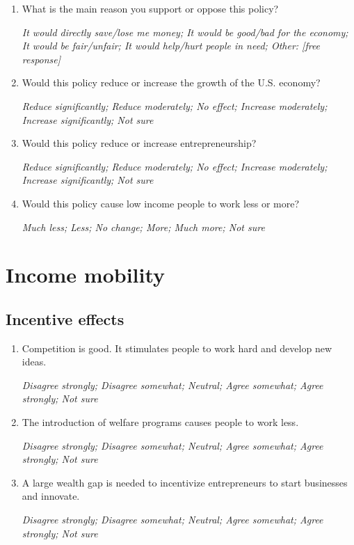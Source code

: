 \documentclass[11pt, headsepline]{article}
\begin{document}
\begin{enumerate}[resume]
    \item What is the main reason you support or oppose this policy?

    \textit{It would directly save/lose me money; It would be good/bad for the economy; It would be fair/unfair; It would help/hurt people in need; Other: [free response]}
    
    \item Would this policy reduce or increase the growth of the U.S. economy?

    \textit{Reduce significantly; Reduce moderately; No effect; Increase moderately; Increase significantly; Not sure}

    \item Would this policy reduce or increase entrepreneurship?

    \textit{Reduce significantly; Reduce moderately; No effect; Increase moderately; Increase significantly; Not sure}

    \item Would this policy cause low income people to work less or more?

    \textit{Much less; Less; No change; More; Much more; Not sure}
\end{enumerate}

\section{Income mobility}

\subsection{Incentive effects}

\begin{enumerate}[resume]
    \item Competition is good. It stimulates people to work hard and develop new ideas.

    \textit{Disagree strongly; Disagree somewhat; Neutral; Agree somewhat; Agree strongly; Not sure}



    \item The introduction of welfare programs causes people to work less.

    \textit{Disagree strongly; Disagree somewhat; Neutral; Agree somewhat; Agree strongly; Not sure}

    \item A large wealth gap is needed to incentivize entrepreneurs to start businesses and innovate.

    \textit{Disagree strongly; Disagree somewhat; Neutral; Agree somewhat; Agree strongly; Not sure}

\end{enumerate}
\end{document}
